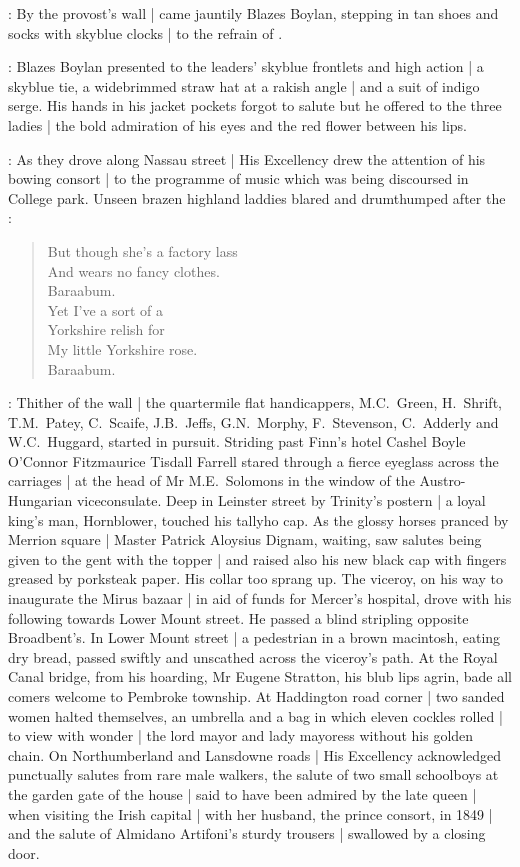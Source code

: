 :
By the provost's wall |
came jauntily Blazes Boylan,
stepping in tan shoes
and socks with skyblue clocks |
to the refrain of
.

:
Blazes Boylan presented to the leaders' skyblue frontlets and high action |
a skyblue tie,
a widebrimmed straw hat at a rakish angle |
and a suit of indigo serge.
His hands in his jacket pockets forgot to salute 
but he offered to the three ladies |
the bold admiration of his eyes
and the red flower between his lips.

:
As they drove along Nassau street |
His Excellency
drew the attention of his bowing consort |
to the programme of music
which was being discoursed in College park.
Unseen brazen highland laddies
blared and drumthumped
after the :%


\begin{verse}
    But though she's a factory lass \\
    And wears no fancy clothes. \\
    Baraabum. \\
    Yet I've a sort of a \\
    Yorkshire relish for \\
    My little Yorkshire rose. \\
    Baraabum.
\end{verse}

:
Thither of the wall |
the quartermile flat handicappers,
M.C.~Green,
H.~Shrift,
T.M.~Patey,
C.~Scaife,
J.B.~Jeffs,
G.N.~Morphy,
F.~Stevenson,
C.~Adderly
and W.C.~Huggard,
started in pursuit.
Striding past Finn's hotel
Cashel Boyle O'Connor Fitzmaurice Tisdall Farrell
stared through a fierce eyeglass
across the carriages |
at the head of Mr M.E.~Solomons
in the window of the Austro-Hungarian viceconsulate.
Deep in Leinster street
by Trinity's postern |
a loyal king's man, Hornblower,
touched his tallyho cap.
As the glossy horses pranced by Merrion square |
Master Patrick Aloysius Dignam, waiting,
saw salutes being given to the gent with the topper |
and raised also his new black cap
with fingers greased by porksteak paper.
His collar too sprang up.
The viceroy,
on his way to inaugurate the Mirus bazaar |
in aid of funds for Mercer's hospital,
drove with his following
towards Lower Mount street.
He passed a blind stripling opposite Broadbent's.
In Lower Mount street |
a pedestrian in a brown macintosh,
eating dry bread,
passed swiftly and unscathed across the viceroy's path.
At the Royal Canal bridge,
from his hoarding,
Mr Eugene Stratton,
his blub lips agrin,
bade all comers welcome to Pembroke township.
At Haddington road corner |
two sanded women halted themselves,
an umbrella and a bag in which eleven cockles rolled |
to view with wonder |
the lord mayor and lady mayoress without his golden chain.
On Northumberland and Lansdowne roads |
His Excellency acknowledged punctually
salutes from rare male walkers,
the salute of two small schoolboys
at the garden gate of the house |
said to have been admired by the late queen |
when visiting the Irish capital |
with her husband, the prince consort, in 1849 |
and the salute of Almidano Artifoni's sturdy trousers |
swallowed by a closing door.
